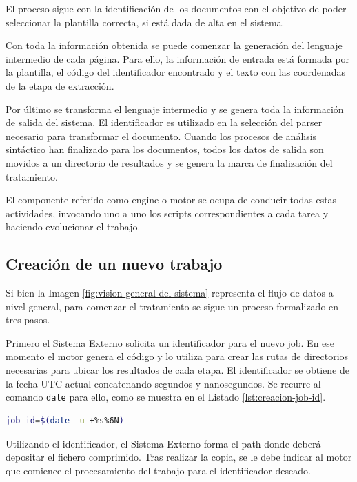 El proceso sigue con la identificación de los documentos con el objetivo de poder seleccionar la plantilla correcta, si está dada de alta en el sistema. 

Con toda la información obtenida se puede comenzar la generación del lenguaje intermedio de cada página. Para ello, la información de entrada está formada por la plantilla, el código del identificador encontrado y el texto con las coordenadas de la etapa de extracción.

Por último se transforma el lenguaje intermedio y se genera toda la información de salida del sistema. El identificador es utilizado en la  selección del parser necesario para transformar el documento. Cuando los procesos de análisis sintáctico han finalizado para los documentos, todos los datos de salida son movidos a un directorio de resultados y se genera la marca de finalización del tratamiento.

El componente referido como engine o motor se ocupa de conducir todas estas actividades, invocando uno a uno los scripts correspondientes a cada tarea y haciendo evolucionar el trabajo.

\subsection{Creación de un nuevo trabajo}

Si bien la Imagen \ref{fig:vision-general-del-sistema} representa el flujo de datos a nivel general, para comenzar el tratamiento se sigue un proceso formalizado en tres pasos. 

Primero el Sistema Externo solicita un identificador para el nuevo job. En ese momento el motor genera el código y lo utiliza para crear las rutas de directorios necesarias para ubicar los resultados de cada etapa. El identificador se obtiene de la fecha UTC actual concatenando segundos y nanosegundos. Se recurre al comando \verb|date| para ello, como se muestra en el Listado \ref{lst:creacion-job-id}.

\begin{lstlisting}[language=bash,caption={Obtención del identificador de un trabajo},label=lst:creacion-job-id]
job_id=$(date -u +%s%6N)
\end{lstlisting}

Utilizando el identificador, el Sistema Externo forma el path donde deberá depositar el fichero comprimido. Tras realizar la copia, se le debe indicar al motor que comience el procesamiento del trabajo para el identificador deseado.

